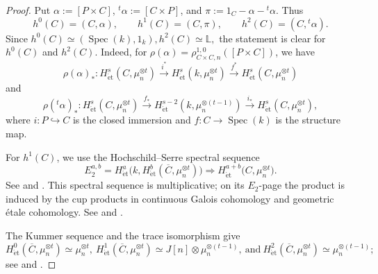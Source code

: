\documentclass[a4paper,12pt]{amsart}
\numberwithin{equation}{section}
\theoremstyle{definition}
\newcommand{\Het}{H_{\mathrm{\acute et}}}
\begin{document}
\begin{proof}
    Put
    $\alpha:=[P\times C]$,
    ${}^t\alpha:=[C\times P]$, and 
    $\pi:=1_C-\alpha-{}^t\alpha$.
    Thus
    \[
    h^0(C)=(C,\alpha),\qquad
    h^1(C)=(C,\pi),\qquad
    h^2(C)=(C,{}^t\alpha).
    \]
    Since $
    h^0(C)\simeq (\operatorname{Spec}(k), 1_k), h^2(C)\simeq \mathbb{L},
    $
    the statement is clear for $h^0(C)$ and $h^2(C)$.
    Indeed, for $\rho(\alpha)=\rho^{1,0}_{C\times C,n}([P\times C])$, we have
    $$
    \rho(\alpha)_\ast: \Het^s(C,\mu_n^{\otimes t})\xrightarrow{i^\ast} \Het^s(k,\mu_n^{\otimes t})\xrightarrow{f^\ast} \Het^s(C,\mu_n^{\otimes t})
    $$
    and
    $$
    \rho({}^t\alpha)_\ast: \Het^s(C,\mu_n^{\otimes t})\xrightarrow{f_\ast} \Het^{s-2}(k,\mu_n^{\otimes (t-1)})\xrightarrow{i_\ast} \Het^s(C,\mu_n^{\otimes t}),
    $$
    where $i:P\hookrightarrow C$ is the closed immersion and $f:C\to \operatorname{Spec}(k)$ is the structure map.
    
    For $h^1(C)$, we use the Hochschild--Serre spectral sequence
    \[
    E_2^{a,b}
    =\Het^a\bigl(k, \Het^b(\overline C,
     \mu_n^{\otimes t})\bigr)
 \Longrightarrow
 \Het^{a+b}\bigl(C,\mu_n^{\otimes t}\bigr).
\]
See \cite[Theorem~12.7 and Example~12.8]{Mil13} and
\cite[Chapter~II, Section~4, Theorem~2.4.1]{NSW08}.  This spectral
sequence is multiplicative; on its $E_2$-page the product is induced
by the cup products in continuous Galois cohomology and geometric
\'etale cohomology.  See \cite[pp.~118--119]{HS53} and
\cite[Chapter~I, Section~4]{NSW08}.

The Kummer sequence and the trace isomorphism give
\[
 \Het^0(\overline C, \mu_n^{\otimes t}) \simeq \mu_n^{\otimes t},\ \Het^1(\overline C,\mu_n^{\otimes t})
 \simeq J[n]\otimes\mu_n^{\otimes (t-1)},\ \mbox{and} 
 \
 \Het^2(\overline C,\mu_n^{\otimes t})
 \simeq\mu_n^{\otimes (t-1)};
\]
see \cite[Proposition~14.2 and Theorem~24.1]{Mil13} and
\cite[Sections~8.2--8.3]{Fu15}. 


\end{proof}
\end{document}
